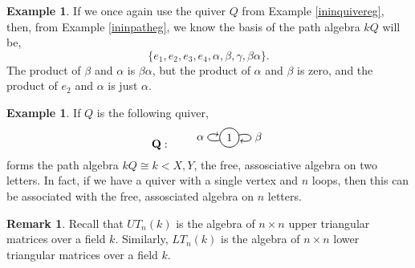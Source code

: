 \documentclass[11.5pt, twoside, a4paper, titlepage]{report}
\theoremstyle{definition}
\newtheorem{rem}[mydef]{Remark}
\newtheorem{eg}[mydef]{Example}
\theoremstyle{plain}
\begin{document}
\begin{eg}
If we once again use the quiver $Q$ from Example \ref{ininquivereg}, then, from Example \ref{ininpatheg}, we know the basis of the path algebra $kQ$ will be,
\begin{equation*}
\{e_1, e_2, e_3, e_4,\alpha, \beta, \gamma, \beta\alpha\}.
\end{equation*}
The product of $\beta$ and $\alpha$ is $\beta\alpha$, but the product of $\alpha$ and $\beta$ is zero, and the product of $e_2$ and $\alpha$ is just $\alpha$.
\end{eg}

\begin{eg}
If $Q$ is the following quiver,
\begin{equation*}
\mathbf{Q}: \qquad
\begin{tikzpicture}[->,-latex, auto, every path/.style={->, semithick}, main node/.style={draw, circle}]
\node	[main node]		(1) at (0,0)		{1};

\draw (1) edge[loop left] node [auto] {$\alpha$} (1);
\draw (1) edge [loop right] node [auto] {$\beta$} (1);
\end{tikzpicture}
\end{equation*}
forms the path algebra $kQ\cong k<X, Y$, the free, assosciative algebra on two letters. In fact, if we have a quiver with a single vertex and $n$ loops, then this can be associated with the free, assosciated algebra on $n$ letters.
\end{eg}

\begin{rem}
Recall that $UT_n(k)$ is the algebra of $n\times n$ upper triangular matrices over a field $k$. Similarly, $LT_n(k)$ is the algebra of $n\times n$ lower triangular matrices over a field $k$.
\end{rem}
\end{document}
